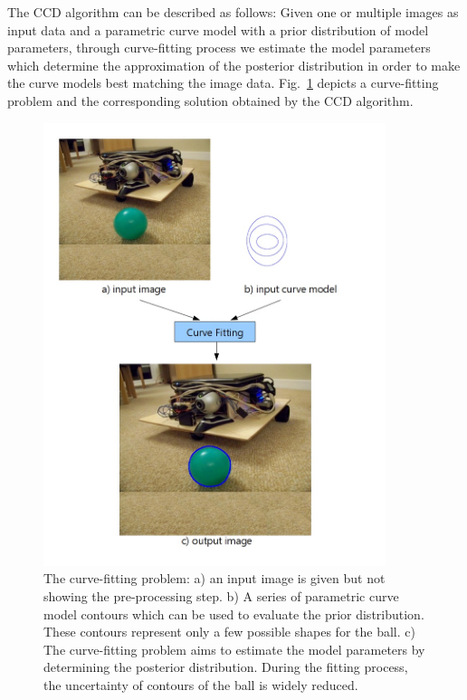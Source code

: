 The CCD algorithm can be described as follows: Given one or multiple images as input
data and a parametric curve model with a prior distribution of model
parameters, through curve-fitting process we estimate the model
parameters which determine the approximation of the posterior
distribution in order to make the curve models best matching the image data.
Fig.~\ref{fig:fitting} depicts a curve-fitting problem and the corresponding solution obtained by the
CCD algorithm.
\begin{figure}[htb]
  \centering
  \includegraphics[width=10cm]{images/fitting.jpg}
  \caption[The description of curve-fitting problem]{The curve-fitting
    problem: a) an input
    image is given but not showing the pre-processing step. b) A series of
    parametric curve model contours which can be used to evaluate the
    prior distribution. These contours represent only a few possible
    shapes for the ball. c) The curve-fitting problem aims to estimate the model
    parameters by determining the posterior distribution. During the
    fitting process, the uncertainty of contours of the ball is widely
    reduced.}
  \label{fig:fitting}
\end{figure}

